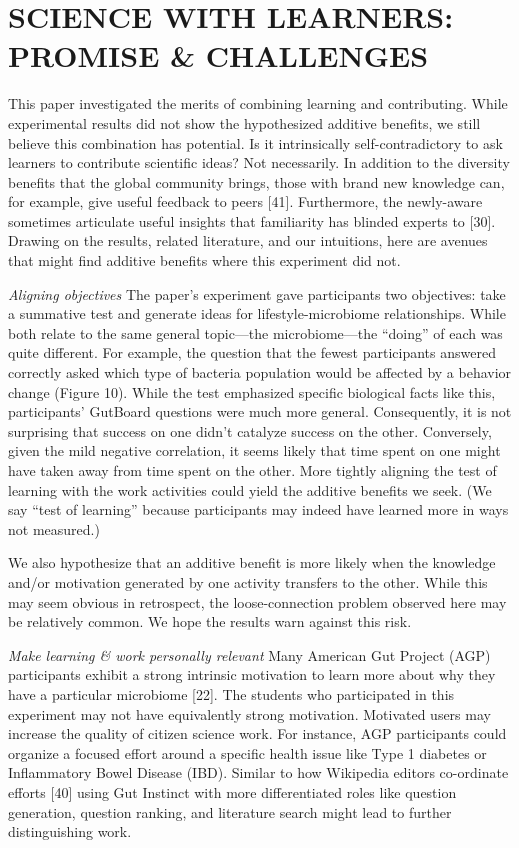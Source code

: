 \section{SCIENCE WITH LEARNERS: PROMISE \& CHALLENGES}
This paper investigated the merits of combining learning and contributing. While experimental results did not show the hypothesized additive benefits, we still believe this combination has potential. Is it intrinsically self-contradictory to ask learners to contribute scientific ideas? Not necessarily. In addition to the diversity benefits that the global community brings, those with brand new knowledge can, for example, give useful feedback to peers [41]. Furthermore, the newly-aware sometimes articulate useful insights that familiarity has blinded experts to [30]. Drawing on the results, related literature, and our intuitions, here are avenues that might find additive benefits where this experiment did not.

\textit{Aligning objectives}
The paper’s experiment gave participants two objectives: take a summative test and generate ideas for lifestyle-microbiome relationships. While both relate to the same general topic—the microbiome—the “doing” of each was quite different. For example, the question that the fewest participants answered correctly asked which type of bacteria population would be affected by a behavior change (Figure 10). While the test emphasized specific biological facts like this, participants’ GutBoard questions were much more general. Consequently, it is not surprising that success on one didn’t catalyze success on the other. Conversely, given the mild negative correlation, it seems likely that time spent on one might have taken away from time spent on the other. More tightly aligning the test of learning with the work activities could yield the additive benefits we seek. (We say “test of learning” because participants may indeed have learned more in ways not measured.) 

We also hypothesize that an additive benefit is more likely when the knowledge and/or motivation generated by one activity transfers to the other. While this may seem obvious in retrospect, the loose-connection problem observed here may be relatively common. We hope the results warn against this risk.

\textit{Make learning \& work personally relevant}
Many American Gut Project (AGP) participants exhibit a strong intrinsic motivation to learn more about why they have a particular microbiome [22]. The students who participated in this experiment may not have equivalently strong motivation. Motivated users may increase the quality of citizen science work. For instance, AGP participants could organize a focused effort around a specific health issue like Type 1 diabetes or Inflammatory Bowel Disease (IBD). Similar to how Wikipedia editors co-ordinate efforts [40] using Gut Instinct with more differentiated roles like question generation, question ranking, and literature search might lead to further distinguishing work.

